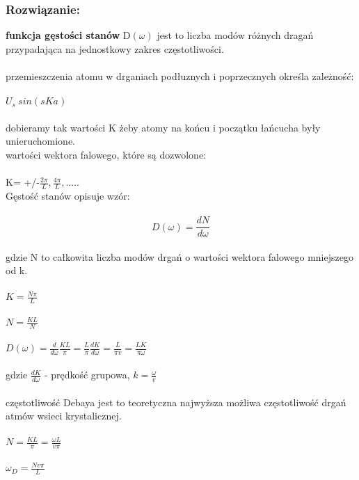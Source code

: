 \subsubsection*{Rozwiązanie:}
\textbf{funkcja gęstości stanów}
D$(\omega)$ jest to liczba modów różnych dragań przypadająca na jednostkowy zakres częstotliwości.
\\
\\
przemieszczenia atomu w drganiach podłuznych i poprzecznych określa zależność:
\\
\\
$U_s ~sin(sKa)$
\\
\\
dobieramy tak wartości K żeby atomy na końcu i początku łańcucha były unieruchomione.
\\
wartości wektora falowego, które są dozwolone:
\\
\\
K= +/-$\frac{2\pi}{L},\frac{4\pi}{L},.....$
\\
Gęstość stanów opisuje wzór:
\\
\\
\begin{equation}
D(\omega)=\frac{dN}{d\omega}
\end{equation}
\\
gdzie N to całkowita liczba modów drgań o wartości wektora falowego mniejszego od k.
\\
\\
$K=\frac{N\pi}{L}$
\\
\\
$N=\frac{KL}{N}$
\\
\\
$D(\omega)=\frac{d}{d\omega}\frac{KL}{\pi}=\frac{L}{\pi}\frac{dK}{d\omega}=\frac{L}{\pi v}=\frac{L K}{\pi \omega}$
\\
\\
gdzie $\frac{dK}{d\omega}$ - prędkość grupowa, $k=\frac{\omega}{v}$
\\
\\
częstotliwość Debaya jest to teoretyczna najwyższa możliwa częstotliwość drgań atmów  wsieci krystalicznej.
\\
\\
$N=\frac{KL}{\pi}=\frac{\omega L}{v\pi}$
\\
\\
$\omega_D=\frac{Nv\pi}{L}$


